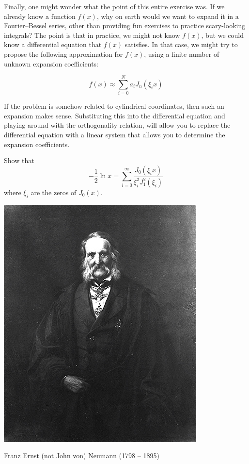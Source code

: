 Finally, one might wonder what the point of this entire exercise was. If we already know a function $f(x)$, why on earth would we want to expand it in a Fourier--Bessel series, other than providing fun exercises to practice scary-looking integrals? The point is that in practice, we might not know $f(x)$, but we could know a differential equation that $f(x)$ satisfies. In that case, we might try to propose the following approximation for $f(x)$, using a finite number of unknown expansion coefficients:

\begin{equation}
f(x) \approx \sum_{i=0}^{N} a_i J_n(\xi_i x)
\end{equation} 

If the problem is somehow related to cylindrical coordinates, then such an expansion makes sense. Substituting this into the differential equation and playing around with the orthogonality relation, will allow you to replace the differential equation with a linear system that allows you to determine the expansion coefficients.

\begin{exer}
Show that
$$-\frac{1}{2} \ln x = \sum_{i=0}^{\infty} \frac{J_0(\xi_i x)}{\xi_i^2 J_1^2(\xi_i)}$$
where $\xi_i$ are the zeros of $J_0(x)$.
\end{exer}



\pagebreak


\begin{marginfigure}[0.3cm]
  \includegraphics{bessel/figures/f_neumann}
  \caption{Franz Ernst (not John von) Neumann (1798 – 1895)}
\end{marginfigure}

